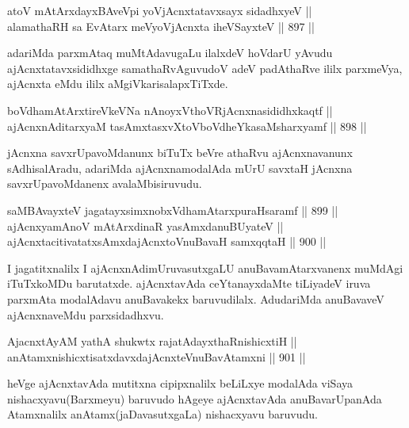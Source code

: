 \begin{shl}
atoV mAtArxdayxBAveV\s pi yoV\s jAcnxtatavxsayx sidadhxyeV || \\
alamathaRH sa EvAtarx meVyoV\s jAcnxta iheVSayxteV \hfill || 897 ||  
\end{shl}

\begin{artha}
adariMda parxmAtaq muMtAdavugaLu ilalxdeV hoVdarU yAvudu ajAcnxtatavxsididhxge samathaRvAguvudoV adeV padAthaRve ililx parxmeVya, ajAcnxta eMdu ililx aMgiVkarisalapxTiTxde.
\end{artha}


\begin{shl}
boVdhamAtArxtireVkeVNa nAnoyxV\s thoVR\s jAcnxnasididhxkaqtf || \\
ajAcnxnAditarxyaM tasAmxtasxvXtoVboVdheYkasaMsharxyamf \hfill || 898 ||  
\end{shl}

\begin{artha}
jAcnxna savxrUpavoMdanunx biTuTx beVre athaRvu ajAcnxnavanunx sAdhisalAradu, adariMda ajAcnxnamodalAda mUrU savxtaH jAcnxna savxrUpavoMdanenx avalaMbisiruvudu.
\end{artha}

\begin{shl}
saMBAvayxteV jagatayxsimxnobxVdhamAtarxpuraHsaramf \hfill || 899 || \\
ajAcnxyamAnoV mAtArxdinaR yasAmxdanuBUyateV || \\
ajAcnxtacitivatatxsAmxdajAcnxtoV\s nuBavaH samxqqtaH \hfill || 900 || 
\end{shl}

\begin{artha}
I jagatitxnalilx I ajAcnxnAdimUruvasutxgaLU anuBavamAtarxvanenx muMdAgi iTuTxkoMDu barutatxde. ajAcnxtavAda ceYtanayxdaMte tiLiyadeV iruva parxmAta modalAdavu anuBavakekx baruvudilalx. AdudariMda anuBavaveV ajAcnxnaveMdu parxsidadhxvu.
\end{artha}


\begin{shl}
AjacnxtAyAM yathA shukwtx rajatAdayxthaRnishicxtiH || \\
anAtamxnishicxtisatxdavxdajAcnxteV\s nuBavAtamxni \hfill || 901 ||  
\end{shl}

\begin{artha}
heVge ajAcnxtavAda mutitxna cipipxnalilx beLiLxye modalAda viSaya nishacxyavu(Barxmeyu) baruvudo hAgeye ajAcnxtavAda anuBavarUpanAda Atamxnalilx anAtamx(jaDavasutxgaLa) nishacxyavu baruvudu.
\end{artha}

